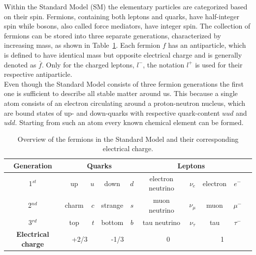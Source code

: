 Within the Standard Model (SM) the elementary particles are categorized based on their spin. Fermions, containing both leptons and quarks, have half-integer spin while bosons, also called force mediators, have integer spin. 
The collection of fermions can be stored into three separate generations, characterized by increasing mass, as shown in Table~\ref{table::ElemParticles}.  Each fermion $f$ has an antiparticle, which is defined to have identical mass but opposite electrical charge and is generally denoted as $\bar{f}$. 
Only for the charged leptons, $l^{-}$, the notation $l^{+}$ is used for their respective antiparticle.
\\
Even though the Standard Model consists of three fermion generations the first one is sufficient to describe all stable matter around us.
This because a single atom consists of an electron circulating around a proton-neutron nucleus, which are bound states of up- and down-quarks with respective quark-content $uud$ and $udd$. Starting from such an atom every known chemical element can be formed. 
\setlength\extrarowheight{5pt}
\begin{table}[h!t]
 \centering
 \caption{Overview of the fermions in the Standard Model and their corresponding electrical charge.} \label{table::ElemParticles}
 \begin{tabular}{|c|cr|cc|cc|cc|c|}
  \hline
  \textbf{Generation} 		& \multicolumn{4}{c|}{\textbf{Quarks}} 				& \multicolumn{4}{c|}{\textbf{Leptons}} 				\\
  \hline
  1$^{st}$ 			& up 		& $u$ 		& down 		& $d$ 		& electron neutrino	& $\nu_{e}$ 	& electron	& $e^{-}$ 	\\
  \hline
  2$^{nd}$ 			& charm 	& $c$ 		& strange 	& $s$		& muon neutrino		& $\nu_{\mu}$ 	& muon		& $\mu^{-}$ 	\\
  \hline
  3$^{rd}$ 			& top		& $t$ 		& bottom 	& $b$ 		& tau neutrino 		& $\nu_{\tau}$ 	& tau		& $\tau^{-}$ 	\\
  \hline
  \hline
  \textbf{Electrical charge} 	& \multicolumn{2}{c|}{+2/3} 	& \multicolumn{2}{c|}{-1/3} 	& \multicolumn{2}{c|}{0} 		& \multicolumn{2}{c|}{1}	\\
  \hline
 \end{tabular}
\end{table}

